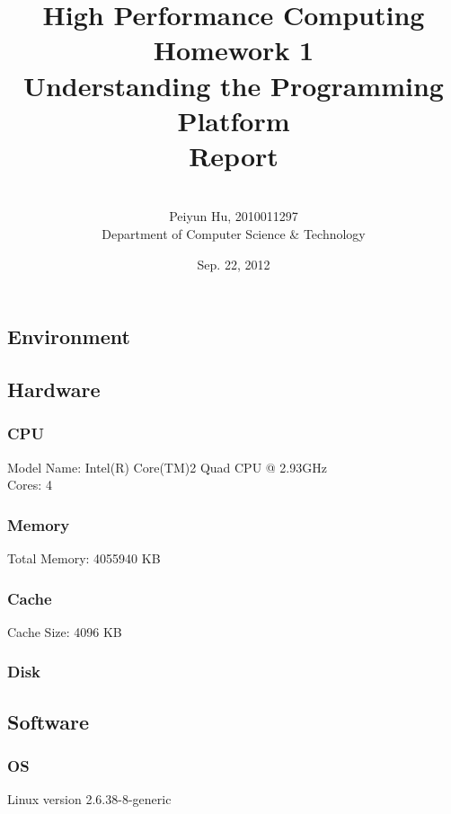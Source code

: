 \documentclass[a4paper]{report}   %
\begin{document}
\begin{CJK}{UTF8}{gbsn}
\title{\vspace{120pt}\huge High Performance Computing\\ Homework 1\\[1em] \huge Understanding the Programming Platform\\[1em] \Large Report}
\author{\\[3em]\Large Peiyun Hu, 2010011297 \\ [1em]\Large Department of Computer Science \& Technology}
\date{Sep. 22, 2012}    %
\maketitle

\chapter{Environment}             %
\section{Hardware}
\subsection{CPU} \label{info:cpu}

Model Name: Intel(R) Core(TM)2 Quad CPU @ 2.93GHz\\
Cores: 4
\subsection{Memory} 
Total Memory: 4055940 KB

\subsection{Cache}
Cache Size: 4096 KB

\subsection{Disk} 


\section{Software}     %

\subsection{OS} 
Linux version 2.6.38-8-generic

\end{CJK}
\end{document}

